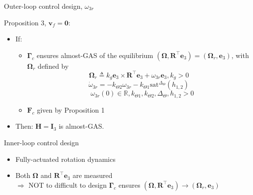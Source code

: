 \documentclass{beamer}
\begin{document}
\begin{frame}{Outer-loop control design, $\omega_{3r}$}
	\begin{block}{Proposition 3, $\mathbf{v}_f = \mathbf{0}$:}
		\begin{itemize}
			\item If:
			\begin{itemize}
				\item $\mathbf{\Gamma}_c$ ensures almost-GAS of the equilibrium $(\mathbf{\Omega}, \mathbf{R}^\top \mathbf{e}_3) = (\mathbf{\Omega}_r, \mathbf{e}_3)$, with $\mathbf{\Omega}_r$ defined by $$\mathbf{\Omega}_r \triangleq k_g \mathbf{e}_3 \times \mathbf{R}^\top \mathbf{e}_3 + \omega_{3r} \mathbf{e}_3, k_g >0  $$
				$$\dot{\omega}_{3r} = -k_{\Theta 2} \omega_{3r} - k_{\Theta 1} \mathrm{sat}^{\Delta_\Theta}(h_{1,2})$$
				 $$\quad \omega_{3r}(0) \in \mathbb{R}, k_{\Theta 1}, k_{\Theta 2}, \Delta_\Theta, h_{1,2} > 0$$
				\item $\mathbf{F}_c$ given by Proposition 1
			\end{itemize}
			\item Then: $\mathbf{H} = \mathbf{I}_3$ is almost-GAS.
		\end{itemize}
	\end{block}	
\end{frame}

\begin{frame}{Inner-loop control design}
	
	\begin{itemize}
		\item Fully-actuated rotation dynamics
		\item Both $\mathbf{\Omega}$ and $\mathbf{R}^\top \mathbf{e}_3$ are measured \\
		$\Rightarrow$ NOT to difficult to design $\mathbf{\Gamma}_c$ ensures $(\mathbf{\Omega}, \mathbf{R}^\top \mathbf{e}_3) \longrightarrow (\mathbf{\Omega}_r, \mathbf{e}_3)$ 
	\end{itemize}
\end{frame}
\end{document}
